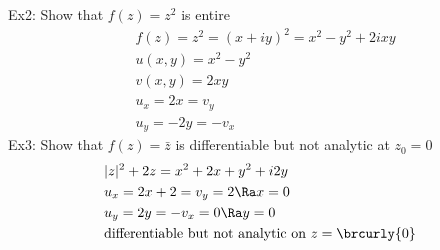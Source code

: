 Ex2: Show that $f(z)=z^2$ is entire
\begin{align*}
    &f(z)=z^2=(x+iy)^2=x^2-y^2+2ixy\\
    &u(x,y)=x^2-y^2\\
    &v(x,y)=2xy\\
    &u_x=2x=v_y\\
    &u_y=-2y=-v_x
\end{align*}
Ex3: Show that $f(z)=\bar{z}$ is differentiable but not analytic at $z_0=0$
\begin{align*}
    &|z|^2+2z=x^2+2x+y^2+i2y\\
    &u_x=2x+2=v_y=2\Ra x=0\\
    &u_y=2y=-v_x=0\Ra y=0\\
    &\text{differentiable but not analytic on }z=\brcurly{0}
\end{align*}

